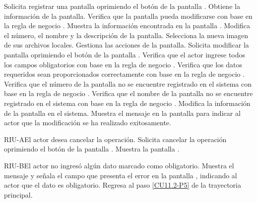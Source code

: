 	\begin{UCtrayectoria}
		\UCpaso[\UCactor] Solicita registrar una pantalla oprimiendo el botón  de la pantalla .
		\UCpaso[\UCsist] Obtiene la información de la pantalla.
		\UCpaso[\UCsist] Verifica que la pantalla pueda modificarse con base en la regla de negocio . 
		\UCpaso[\UCsist] Muestra la información encontrada en la pantalla .
		\UCpaso[\UCactor] Modifica el número, el nombre y la descripción de la pantalla. \label{CU11.2-P5}
		\UCpaso[\UCactor] Selecciona la nueva imagen de sus archivos locales. \label{CU11.2-P6}
		\UCpaso[\UCactor] Gestiona las acciones de la pantalla. \label{CU11.2-P7}
		\UCpaso[\UCactor] Solicita modificar la pantalla oprimiendo el botón  de la pantalla . 
		\UCpaso[\UCsist] Verifica que el actor ingrese todos los campos obligatorios con base en la regla de negocio . 
		\UCpaso[\UCsist] Verifica que los datos requeridos sean proporcionados correctamente con base en la regla de negocio .     
		\UCpaso[\UCsist] Verifica que el número de la pantalla no se encuentre registrado en el sistema con base en la regla de negocio . 
		\UCpaso[\UCsist] Verifica que el nombre de la pantalla no se encuentre registrado en el sistema con base en la regla de negocio .  
		\UCpaso[\UCsist] Modifica la información de la pantalla en el sistema.
		\UCpaso[\UCsist] Muestra el mensaje  en la pantalla  para indicar al actor que la modificación se ha realizado exitosamente.
	\end{UCtrayectoria}		

	\begin{UCtrayectoriaA}{RIU-A}{El actor desea cancelar la operación.}
		\UCpaso[\UCactor] Solicita cancelar la operación oprimiendo el botón  de la pantalla .
		\UCpaso[\UCsist] Muestra la pantalla .
	\end{UCtrayectoriaA}

	\begin{UCtrayectoriaA}{RIU-B}{El actor no ingresó algún dato marcado como obligatorio.}
		\UCpaso[\UCsist] Muestra el mensaje  y señala el campo que presenta el error en la pantalla , indicando al actor que el dato es obligatorio.
		\UCpaso Regresa al paso \ref{CU11.2-P5} de la trayectoria principal.
	\end{UCtrayectoriaA}

